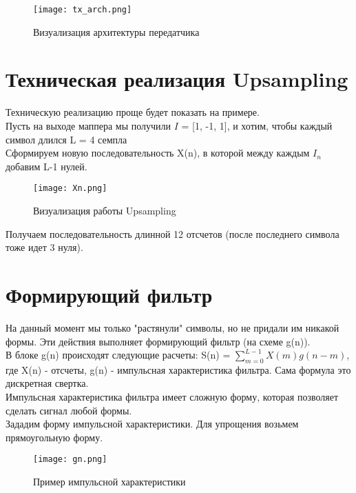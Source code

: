 \begin{figure}[H]
    \centering
    \texttt{[image: tx\_arch.png]}
    \caption{Визуализация архитектуры передатчика}
\end{figure}

\section*{\textbf{Техническая реализация Upsampling}}

Техническую реализацию проще будет показать на примере. \\

Пусть на выходе маппера мы получили $I$ = [1, -1, 1], и хотим, чтобы каждый символ длился L = 4 семпла\\

Сформируем новую последовательность X(n), в которой между каждым $I_n$ добавим L-1 нулей.

\begin{figure}[H]
    \centering
    \texttt{[image: Xn.png]}
    \caption{Визуализация работы Upsampling}
\end{figure}

Получаем последовательность длинной 12 отсчетов (после последнего символа тоже идет 3 нуля).

\section*{\textbf{Формирующий фильтр}}

На данный момент мы только "растянули" символы, но не придали им никакой формы. Эти действия выполняет формирующий фильтр (на схеме g(n)). \\

В блоке g(n) происходят следующие расчеты: S(n) = $\sum_{m = 0}^{L-1}X(m)g(n-m)$, где X(n) - отсчеты, g(n) - импульсная характеристика фильтра.
Сама формула это дискретная свертка. \\

Импульсная характеристика фильтра имеет сложную форму, которая позволяет сделать сигнал любой формы. \\

Зададим форму импульсной характеристики. Для упрощения возьмем прямоугольную форму.

\begin{figure}[H]
    \centering
    \texttt{[image: gn.png]}
    \caption{Пример импульсной характеристики}
\end{figure}

